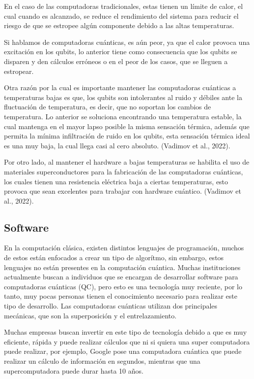 \documentclass{article}
\begin{document}
En el caso de las computadoras tradicionales, estas tienen un límite de calor, el cual cuando es alcanzado, se reduce el rendimiento del sistema para reducir el riesgo de que se estropee algún componente debido a las altas temperaturas.

 Si hablamos de computadoras cuánticas, es aún peor, ya que el calor provoca una excitación en los qubits, lo anterior tiene como consecuencia que los qubits se disparen y den cálculos erróneos o en el peor de los casos, que se lleguen a estropear. 

Otra razón por la cual es importante mantener las computadoras cuánticas a temperaturas bajas es que, los qubits son intolerantes al ruido y débiles ante la fluctuación de temperatura, es decir, que no soportan los cambios de temperatura. Lo anterior se soluciona encontrando una temperatura estable, la cual mantenga en el mayor lapso posible la misma sensación térmica, además que permita la mínima infiltración de ruido en los qubits, esta sensación térmica ideal es una muy baja, la cual llega casi al cero absoluto. (Vadimov et al., 2022).

Por otro lado, al mantener el hardware a bajas temperaturas se habilita el uso de materiales superconductores para la fabricación de las computadoras cuánticas, los cuales tienen una resistencia eléctrica baja a ciertas temperaturas, esto provoca que sean excelentes para trabajar con hardware cuántico. (Vadimov et al., 2022).


\subsection{Software}
En la computación clásica, existen distintos lenguajes de programación, muchos de estos están enfocados a crear un tipo de algorítmo, sin embargo, estos lenguajes no están presentes en la computación cuántica. Muchas instituciones actualmente buscan a individuos que se encargan de desarrollar software para computadoras cuánticas (QC), pero esto es una tecnología muy reciente, por lo tanto, muy pocas personas tienen el conocimiento necesario para realizar este tipo de desarrollo. Las computadoras cuánticas utilizan dos principales mecánicas, que son la superposición y el entrelazamiento. 

Muchas empresas buscan invertir en este tipo de tecnología debido a que es muy eficiente, rápida y puede realizar cálculos que ni si quiera una super computadora puede realizar, por ejemplo, Google pose una computadora cuántica que puede realizar un cálculo de información en segundos, mientras que una supercomputadora puede durar hasta 10 años. 
\end{document}
